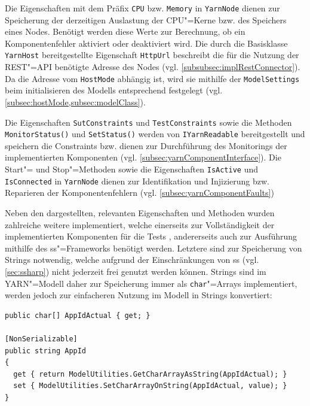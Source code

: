 Die Eigenschaften mit dem Präfix \texttt{CPU} bzw. \texttt{Memory} in \texttt{YarnNode} dienen zur Speicherung der derzeitigen Auslastung der CPU"=Kerne bzw. des Speichers eines Nodes.
Benötigt werden diese Werte zur Berechnung, ob ein Komponentenfehler aktiviert oder deaktiviert wird.
Die durch die Basisklasse \texttt{YarnHost} bereitgestellte Eigenschaft \texttt{HttpUrl} beschreibt die für die Nutzung der \gls{REST}"=API benötigte Adresse des Nodes (vgl. \cref{subsubsec:implRestConnector}).
Da die Adresse vom \texttt{HostMode} abhängig ist, wird sie mithilfe der \texttt{ModelSettings} beim initialisieren des Modells entsprechend festgelegt (vgl. \cref{subsec:hostMode,subsec:modelClass}).

Die Eigenschaften \texttt{SutConstraints} und \texttt{TestConstraints} sowie die Methoden \texttt{MonitorStatus()} und \texttt{SetStatus()} werden von \texttt{IYarnReadable} bereitgestellt und speichern die Constraints bzw. dienen zur Durchführung des Monitorings der implementierten Komponenten (vgl. \cref{subsec:yarnComponentInterface}).
Die Start"= und Stop"=Methoden sowie die Eigenschaften \texttt{IsActive} und \texttt{IsConnected} in \texttt{YarnNode} dienen zur Identifikation und Injizierung bzw. Reparieren der Komponentenfehlern (vgl. \cref{subsec:yarnComponentFaults})

Neben den dargestellten, relevanten Eigenschaften und Methoden wurden zahlreiche weitere implementiert, welche einerseits zur Vollständigkeit der implementierten Komponenten für die Tests \cite{Eberhardinger2018}, andererseits auch zur Ausführung mithilfe des \gls{ss}"=Frameworks benötigt werden.
Letztere sind \zB zur Speicherung von Strings notwendig, welche aufgrund der Einschränkungen von \gls{ss} (vgl. \cref{sec:ssharp}) \uU nicht jederzeit frei genutzt werden können.
Strings sind im \gls{YARN}"=Modell daher zur Speicherung immer als  \texttt{char}"=Arrays implementiert, werden jedoch zur einfacheren Nutzung im Modell in Strings konvertiert:

\begin{lstlisting}[label=lst:modelCharArrayAsString,style=cs,
caption={[Implementierung der Eigenschaft AppId]
    Implementierung der Eigenschaft \texttt{AppId}.
    Die beiden Methoden \texttt{GetCharArrayAsString} und \texttt{SetCharArrayOnString} führen die Konvertierung in den \texttt{char}"=Array bzw. des \texttt{char}"=Arrays in einen String durch.
    Das Attribut \texttt{NonSerializable} definiert, dass die Eigenschaft bei der Ausführung der Simulation von \gls{ss} ignoriert wird.}]
public char[] AppIdActual { get; }

[NonSerializable]
public string AppId
{
  get { return ModelUtilities.GetCharArrayAsString(AppIdActual); }
  set { ModelUtilities.SetCharArrayOnString(AppIdActual, value); }
}
\end{lstlisting}

